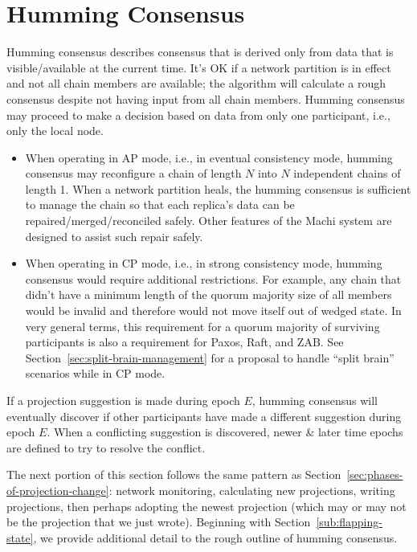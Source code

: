 \documentclass[preprint,10pt]{sigplanconf}
\begin{document}
\section{Humming Consensus}
\label{sec:humming-consensus}

Humming consensus describes consensus that is derived only from data
that is visible/available at the current time.  It's OK if a network
partition is in effect and not all chain members are available;
the algorithm will calculate a rough consensus despite not
having input from all chain members.  Humming consensus
may proceed to make a decision based on data from only one
participant, i.e., only the local node.

\begin{itemize}

\item When operating in AP mode, i.e., in eventual consistency mode, humming
consensus may reconfigure a chain of length $N$ into $N$
independent chains of length 1.  When a network partition heals, the
humming consensus is sufficient to manage the chain so that each
replica's data can be repaired/merged/reconciled safely.
Other features of the Machi system are designed to assist such
repair safely.

\item When operating in CP mode, i.e., in strong consistency mode, humming
consensus would require additional restrictions.  For example, any
chain that didn't have a minimum length of the quorum majority size of
all members would be invalid and therefore would not move itself out
of wedged state.  In very general terms, this requirement for a quorum
majority of surviving participants is also a requirement for Paxos,
Raft, and ZAB. See Section~\ref{sec:split-brain-management} for a
proposal to handle ``split brain'' scenarios while in CP mode.

\end{itemize}

If a projection suggestion is made during epoch $E$, humming consensus
will eventually discover if other participants have made a different
suggestion during epoch $E$.  When a conflicting suggestion is
discovered, newer \& later time epochs are defined to try to resolve
the conflict.

The next portion of this section follows the same pattern as
Section~\ref{sec:phases-of-projection-change}: network monitoring,
calculating new projections, writing projections, then perhaps
adopting the newest projection (which may or may not be the projection
that we just wrote).
Beginning with Section~\ref{sub:flapping-state}, we provide
additional detail to the rough outline of humming consensus.
\end{document}
